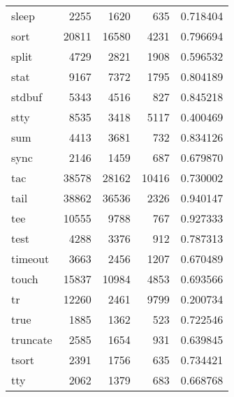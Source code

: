 \begin{tabular}{lrrrr}
sleep     &                     2255 &         1620 &           635 &                 0.718404 \\
sort      &                    20811 &        16580 &          4231 &                 0.796694 \\
split     &                     4729 &         2821 &          1908 &                 0.596532 \\
stat      &                     9167 &         7372 &          1795 &                 0.804189 \\
stdbuf    &                     5343 &         4516 &           827 &                 0.845218 \\
stty      &                     8535 &         3418 &          5117 &                 0.400469 \\
sum       &                     4413 &         3681 &           732 &                 0.834126 \\
sync      &                     2146 &         1459 &           687 &                 0.679870 \\
tac       &                    38578 &        28162 &         10416 &                 0.730002 \\
tail      &                    38862 &        36536 &          2326 &                 0.940147 \\
tee       &                    10555 &         9788 &           767 &                 0.927333 \\
test      &                     4288 &         3376 &           912 &                 0.787313 \\
timeout   &                     3663 &         2456 &          1207 &                 0.670489 \\
touch     &                    15837 &        10984 &          4853 &                 0.693566 \\
tr        &                    12260 &         2461 &          9799 &                 0.200734 \\
true      &                     1885 &         1362 &           523 &                 0.722546 \\
truncate  &                     2585 &         1654 &           931 &                 0.639845 \\
tsort     &                     2391 &         1756 &           635 &                 0.734421 \\
tty       &                     2062 &         1379 &           683 &                 0.668768 \\

\end{tabular}
